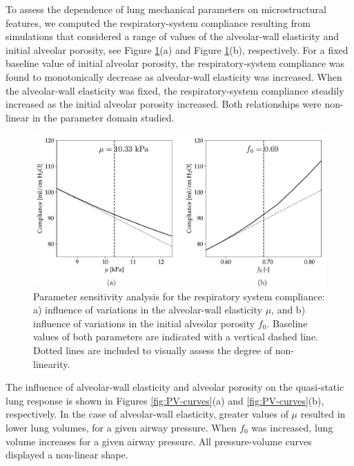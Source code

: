 \documentclass[preprint,3p,12pt,number,sort&compress]{elsarticle}
\begin{document}
To assess the dependence of lung mechanical parameters on microstructural features, we computed the respiratory-system compliance resulting from simulations that considered a range of values of the alveolar-wall elasticity and initial alveolar porosity, see Figure \ref{fig:compliance-relations}(a) and Figure \ref{fig:compliance-relations}(b), respectively. For a fixed baseline value of initial alveolar porosity, the respiratory-system compliance was found to monotonically decrease as alveolar-wall elasticity was increased. When the alveolar-wall elasticity was fixed, the respiratory-system compliance steadily increased as the initial alveolar porosity increased. Both relationships were non-linear in the parameter domain studied.\\     
\begin{figure}[h!]
    \begin{center}
    \includegraphics[width=1 \textwidth]{./Figures/SA_compliance.pdf}
    \caption[]{Parameter sensitivity analysis for the respiratory system compliance: a) influence of variations in the alveolar-wall elasticity $\mu$, and b) influence of variations in the initial alveolar porosity $f_0$. Baseline values of both parameters are indicated with a vertical dashed line. Dotted lines are included to visually assess the degree of non-linearity.}
    \label{fig:compliance-relations}
    \end{center}
\end{figure}

The influence of alveolar-wall elasticity and alveolar porosity on the quasi-static lung response is shown in Figures \ref{fig:PV-curves}(a) and \ref{fig:PV-curves}(b), respectively. In the case of alveolar-wall elasticity, greater values of $\mu$ resulted in lower lung volumes, for a given airway pressure. When $f_0$ was increased, lung volume increases for a given airway pressure. All pressure-volume curves displayed a non-linear shape.\\
\end{document}
